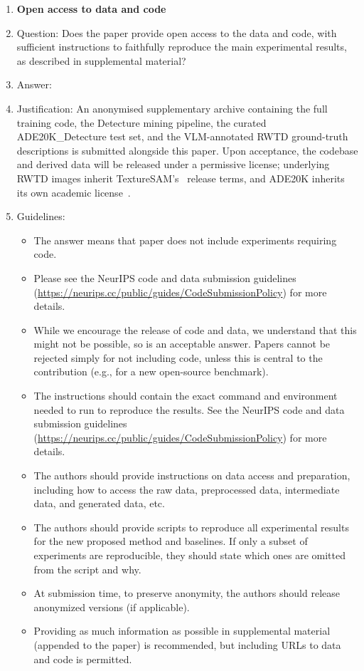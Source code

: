 \begin{enumerate}
\item {\bf Open access to data and code}
    \item[] Question: Does the paper provide open access to the data and code, with sufficient instructions to faithfully reproduce the main experimental results, as described in supplemental material?
    \item[] Answer: \answerYes{}
    \item[] Justification: An anonymised supplementary archive containing the full training code, the Detecture mining pipeline, the curated ADE20K\_Detecture test set, and the VLM-annotated RWTD ground-truth descriptions is submitted alongside this paper. Upon acceptance, the codebase and derived data will be released under a permissive license; underlying RWTD images inherit TextureSAM's~\cite{texturesam} release terms, and ADE20K inherits its own academic license~\cite{ade20k}.
    \item[] Guidelines:
    \begin{itemize}
        \item The answer \answerNA{} means that paper does not include experiments requiring code.
        \item Please see the NeurIPS code and data submission guidelines (\url{https://neurips.cc/public/guides/CodeSubmissionPolicy}) for more details.
        \item While we encourage the release of code and data, we understand that this might not be possible, so \answerNo{} is an acceptable answer. Papers cannot be rejected simply for not including code, unless this is central to the contribution (e.g., for a new open-source benchmark).
        \item The instructions should contain the exact command and environment needed to run to reproduce the results. See the NeurIPS code and data submission guidelines (\url{https://neurips.cc/public/guides/CodeSubmissionPolicy}) for more details.
        \item The authors should provide instructions on data access and preparation, including how to access the raw data, preprocessed data, intermediate data, and generated data, etc.
        \item The authors should provide scripts to reproduce all experimental results for the new proposed method and baselines. If only a subset of experiments are reproducible, they should state which ones are omitted from the script and why.
        \item At submission time, to preserve anonymity, the authors should release anonymized versions (if applicable).
        \item Providing as much information as possible in supplemental material (appended to the paper) is recommended, but including URLs to data and code is permitted.
    \end{itemize}



\end{enumerate}
